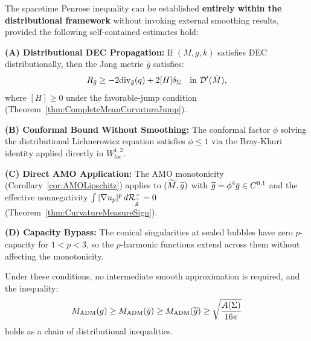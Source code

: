 \begin{theorem}\label{thm:SelfContainedProof}
The spacetime Penrose inequality can be established \textbf{entirely within the distributional framework} without invoking external smoothing results, provided the following self-contained estimates hold:

\textbf{(A) Distributional DEC Propagation:} If $(M,g,k)$ satisfies DEC distributionally, then the Jang metric $\bar{g}$ satisfies:
\begin{equation}
    R_{\bar{g}} \ge -2\mathrm{div}_{\bar{g}}(q) + 2[H]\delta_\Sigma \quad \text{in } \mathcal{D}'(\bar{M}),
\end{equation}
where $[H] \ge 0$ under the favorable-jump condition (Theorem~\ref{thm:CompleteMeanCurvatureJump}).

\textbf{(B) Conformal Bound Without Smoothing:} The conformal factor $\phi$ solving the distributional Lichnerowicz equation satisfies $\phi \le 1$ via the Bray-Khuri identity applied directly in $W^{1,2}_{loc}$.

\textbf{(C) Direct AMO Application:} The AMO monotonicity (Corollary~\ref{cor:AMOLipschitz}) applies to $(\widetilde{M}, \widetilde{g})$ with $\widetilde{g} = \phi^4 \bar{g} \in C^{0,1}$ and the effective nonnegativity $\int |\nabla u_p|^p \, d\mathcal{R}_{\widetilde{g}}^- = 0$ (Theorem~\ref{thm:CurvatureMeasureSign}).

\textbf{(D) Capacity Bypass:} The conical singularities at sealed bubbles have zero $p$-capacity for $1 < p < 3$, so the $p$-harmonic functions extend across them without affecting the monotonicity.

Under these conditions, no intermediate smooth approximation is required, and the inequality:
\begin{equation}
    M_{\mathrm{ADM}}(g) \ge M_{\mathrm{ADM}}(\bar{g}) \ge M_{\mathrm{ADM}}(\widetilde{g}) \ge \sqrt{\frac{A(\Sigma)}{16\pi}}
\end{equation}
holds as a chain of distributional inequalities.
\end{theorem}

